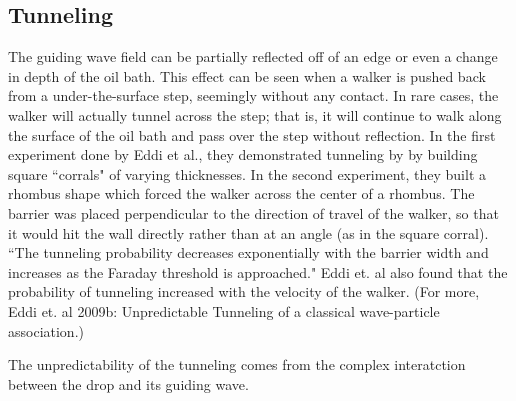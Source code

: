\subsection{Tunneling}
	       The guiding wave field can be partially reflected off of an edge or even a change in depth of the oil bath. This effect can be seen when a walker is pushed back from a under-the-surface step, seemingly without any contact. In rare cases, the walker will actually tunnel across the step; that is, it will continue to walk along the surface of the oil bath and pass over the step without reflection. In the first experiment done by Eddi et al., they demonstrated tunneling by by building square ``corrals" of varying thicknesses. In the second experiment, they built a rhombus shape which forced the walker across the center of a rhombus. The barrier was placed perpendicular to the direction of travel of the walker, so that it would hit the wall directly rather than at an angle (as in the square corral). ``The tunneling probability decreases exponentially with the barrier width and increases as the Faraday threshold is approached." Eddi et. al also found that the probability of tunneling increased with the velocity of the walker. (For more, Eddi et. al 2009b: Unpredictable Tunneling of a classical wave-particle association.)
	       
	       
	        The unpredictability of the tunneling comes from the complex interatction between the drop and its guiding wave. 


